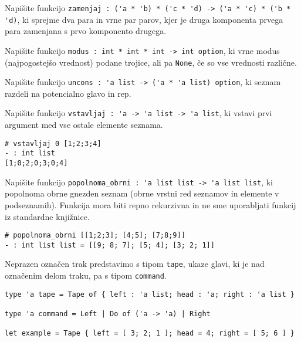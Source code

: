 \documentclass[arhiv]{../izpit}
\begin{document}
	


\naloga

\podnaloga
Napišite funkcijo \verb|zamenjaj : ('a * 'b) * ('c * 'd) -> ('a * 'c) * ('b * 'd)|, ki sprejme dva para in vrne par parov, kjer je druga komponenta prvega para zamenjana s prvo komponento drugega.
  
\podnaloga
 Napišite funkcijo \verb|modus : int * int * int -> int option|, ki vrne modus 
  (najpogostejšo vrednost) podane trojice, ali pa \verb|None|, če so vse vrednosti 
  različne.
  
\podnaloga
 Napišite funkcijo \verb|uncons : 'a list -> ('a * 'a list) option|, ki seznam razdeli
  na potencialno glavo in rep.

\podnaloga
 Napišite funkcijo \verb|vstavljaj : 'a -> 'a list -> 'a list|, ki vstavi prvi 
  argument med vse ostale elemente seznama.

\begin{verbatim}
# vstavljaj 0 [1;2;3;4]
- : int list
[1;0;2;0;3;0;4]
\end{verbatim}

\podnaloga
Napišite funkcijo \verb|popolnoma_obrni : 'a list list -> 'a list list|, ki popolnoma obrne gnezden seznam (obrne vrstni red seznamov in elemente v podseznamih).
Funkcija mora biti repno rekurzivna in ne sme uporabljati funkcij iz standardne knjižnice.

\begin{verbatim}
# popolnoma_obrni [[1;2;3]; [4;5]; [7;8;9]]
- : int list list = [[9; 8; 7]; [5; 4]; [3; 2; 1]]
\end{verbatim}


\naloga

Neprazen označen trak predstavimo s tipom \verb|tape|, ukaze glavi, ki je nad označenim delom traku, pa s tipom \verb|command|.

\begin{verbatim}
type 'a tape = Tape of { left : 'a list; head : 'a; right : 'a list }

type 'a command = Left | Do of ('a -> 'a) | Right

let example = Tape { left = [ 3; 2; 1 ]; head = 4; right = [ 5; 6 ] }
\end{verbatim}
\end{document}
